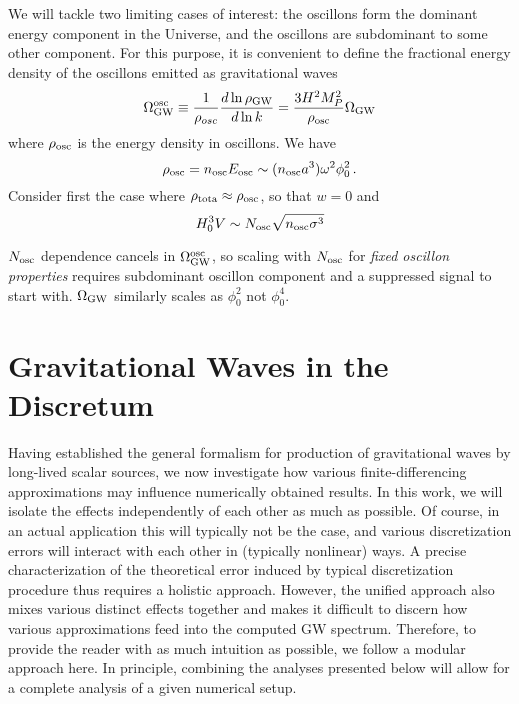 \documentclass{revtex4}
\begin{document}
We will tackle two limiting cases of interest: the oscillons form the dominant energy component in the Universe, and the oscillons are subdominant to some other component.
For this purpose, it is convenient to define the fractional energy density of the oscillons emitted as gravitational waves
\begin{equation}
  \Omega_{\rm GW}^{\rm osc} \equiv \frac{1}{\rho_{osc}}\frac{d\ln\rho_{\rm GW}}{d\ln k} = \frac{3H^2M_P^2}{\rho_{\rm osc}}\Omega_{\rm GW}
\end{equation}
where $\rho_{\rm osc}$ is the energy density in oscillons.
We have
\begin{equation}
  \rho_{\rm osc} = n_{\rm osc}E_{\rm osc} \sim (n_{\rm osc}a^3)\omega^2\phi_0^2 \, .
\end{equation}
Consider first the case where $\rho_{\rm tota} \approx \rho_{\rm osc}$, so that $w=0$ and
\begin{equation}
  H_0^3V \sim N_{\rm osc}\sqrt{n_{\rm osc}\sigma^3}
\end{equation}

$N_{\rm osc}$ dependence cancels in $\Omega_{\rm GW}^{\rm osc}$, so scaling with $N_{\rm osc}$ for \emph{fixed oscillon properties} requires subdominant oscillon component and a suppressed signal to start with.
$\Omega_{\rm GW}$ similarly scales as $\phi_0^2$ not $\phi_0^4$.

\section{Gravitational Waves in the Discretum}
Having established the general formalism for production of gravitational waves by long-lived scalar sources, we now investigate how various finite-differencing approximations may influence numerically obtained results.
In this work, we will isolate the effects independently of each other as much as possible.
Of course, in an actual application this will typically not be the case, and various discretization errors will interact with each other in (typically nonlinear) ways.
A precise characterization of the theoretical error induced by typical discretization procedure thus requires a holistic approach.
However, the unified approach also mixes various distinct effects together and makes it difficult to discern how various approximations feed into the computed GW spectrum.
Therefore, to provide the reader with as much intuition as possible, we follow a modular approach here.
In principle, combining the analyses presented below will allow for a complete analysis of a given numerical setup.
\end{document}
